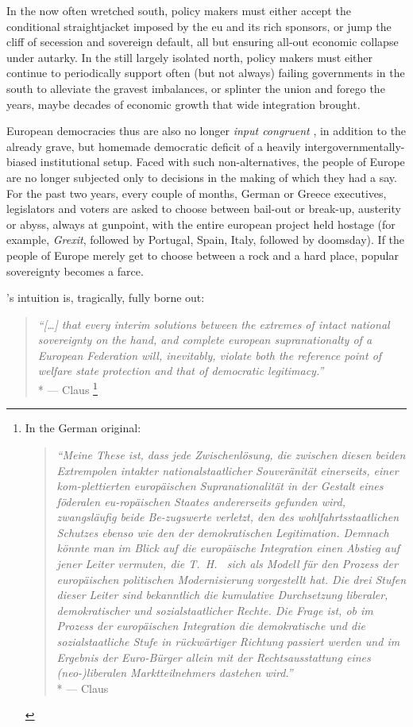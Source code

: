 In the now often wretched south, policy makers must either accept the conditional straightjacket imposed by the \gls{eu} and its rich sponsors, or jump the cliff of secession and sovereign default, all but ensuring all-out economic collapse under autarky.
In the still largely isolated north, policy makers must either continue to periodically support often (but not always) failing governments in the south to alleviate the gravest imbalances, or splinter the union and forego the years, maybe decades of economic growth that wide integration brought.

European democracies thus are also no longer \emph{input congruent} \citep{Zurn-2000-aa}, in addition to the already grave, but homemade democratic deficit of a heavily intergovernmentally-biased institutional setup.
Faced with such non-alternatives, the people of Europe are no longer subjected only to decisions in the making of which they had a say.
For the past two years, every couple of months, German or Greece executives, legislators and voters are asked to choose between bail-out or break-up, austerity or abyss, always at gunpoint, with the entire european project held hostage (for example, \emph{Grexit}, followed by Portugal, Spain, Italy, followed by doomsday).
If the people of Europe merely get to choose between a rock and a hard place, popular sovereignty becomes a farce.

\citeauthor{Offe1998}'s \citeyearpar{Offe1998} intuition is, tragically, fully borne out:
\begin{quote}
	\emph{``[\ldots] that every interim solutions between the extremes of intact national sovereignty on the hand, and complete european supranationalty of a European Federation will, inevitably, violate both the reference point of welfare state protection and that of democratic legitimacy.''}
	\\*
	--- Claus \citet[41]{Offe1998}
	\footnote{\label{fn:Offe-regress}
		In the German original:
		\begin{quote}
			\emph{``Meine These ist, dass jede Zwischenlösung, die zwischen diesen beiden Extrempolen intakter nationalstaatlicher Souveränität einerseits, einer kom-plettierten europäischen Supranationalität in der Gestalt eines föderalen eu-ropäischen Staates andererseits gefunden wird, zwangsläufig beide Be-zugswerte verletzt, den des wohlfahrtsstaatlichen Schutzes ebenso wie den der demokratischen Legitimation.
			Demnach könnte man im Blick auf die europäische Integration einen Abstieg auf jener Leiter vermuten, die T.~H.~\cite{Marshall-1950-aa} sich als Modell für den Prozess der europäischen politischen Modernisierung vorgestellt hat.
			Die drei Stufen dieser Leiter sind bekanntlich die kumulative Durchsetzung liberaler, demokratischer und sozialstaatlicher Rechte.
			Die Frage ist, ob im Prozess der europäischen Integration die demokratische und die sozialstaatliche Stufe in rückwärtiger Richtung passiert werden und im Ergebnis der Euro-Bürger allein mit der Rechtsausstattung eines (neo-)liberalen Marktteilnehmers dastehen wird.''}
			\\*
			--- Claus \citet[41]{Offe1998}
		\end{quote}
	}
\end{quote}

